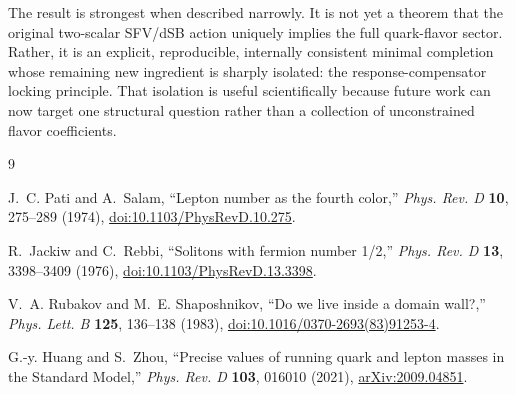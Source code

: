 \documentclass[11pt]{article}
\begin{document}
The result is strongest when described narrowly. It is not yet a theorem that the original two-scalar SFV/dSB action uniquely implies the full quark-flavor sector. Rather, it is an explicit, reproducible, internally consistent minimal completion whose remaining new ingredient is sharply isolated: the response-compensator locking principle. That isolation is useful scientifically because future work can now target one structural question rather than a collection of unconstrained flavor coefficients.

\begin{thebibliography}{9}

J.~C. Pati and A.~Salam,
``Lepton number as the fourth color,''
\emph{Phys. Rev. D} \textbf{10}, 275--289 (1974),
\href{https://doi.org/10.1103/PhysRevD.10.275}{doi:10.1103/PhysRevD.10.275}.

R.~Jackiw and C.~Rebbi,
``Solitons with fermion number 1/2,''
\emph{Phys. Rev. D} \textbf{13}, 3398--3409 (1976),
\href{https://doi.org/10.1103/PhysRevD.13.3398}{doi:10.1103/PhysRevD.13.3398}.

V.~A. Rubakov and M.~E. Shaposhnikov,
``Do we live inside a domain wall?,''
\emph{Phys. Lett. B} \textbf{125}, 136--138 (1983),
\href{https://doi.org/10.1016/0370-2693(83)91253-4}{doi:10.1016/0370-2693(83)91253-4}.

G.-y. Huang and S.~Zhou,
``Precise values of running quark and lepton masses in the Standard Model,''
\emph{Phys. Rev. D} \textbf{103}, 016010 (2021),
\href{https://arxiv.org/abs/2009.04851}{arXiv:2009.04851}.

\end{thebibliography}
\end{document}
